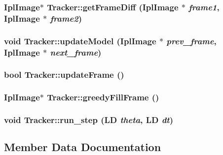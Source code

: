 \subsubsection{\setlength{\rightskip}{0pt plus 5cm}IplImage$\ast$ Tracker::getFrameDiff (IplImage $\ast$ {\em frame1}, IplImage $\ast$ {\em frame2})}\label{classTracker_67809409f88f4384220c128e9ddbec15}


\subsubsection{\setlength{\rightskip}{0pt plus 5cm}void Tracker::updateModel (IplImage $\ast$ {\em prev\_\-frame}, IplImage $\ast$ {\em next\_\-frame})}\label{classTracker_991ce3039007bfc315a8feef77b88ed0}


\subsubsection{\setlength{\rightskip}{0pt plus 5cm}bool Tracker::updateFrame ()}\label{classTracker_658a9c0a99c9c0c69034be9772b23921}


\subsubsection{\setlength{\rightskip}{0pt plus 5cm}IplImage$\ast$ Tracker::greedyFillFrame ()}\label{classTracker_36a43fe254c2b8ca1654a683b4742c03}


\subsubsection{\setlength{\rightskip}{0pt plus 5cm}void Tracker::run\_\-step ({\bf LD} {\em theta}, {\bf LD} {\em dt})}\label{classTracker_55559aeacda84065f9916520be757d69}




\subsection{Member Data Documentation}
